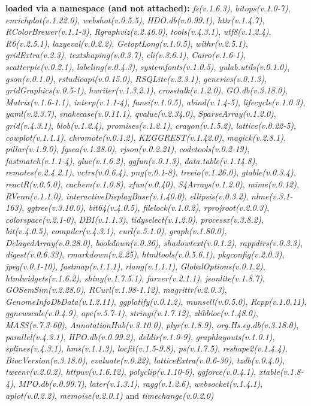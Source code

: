 \documentclass[
]{book}
\begin{document}
\textbf{loaded via a namespace (and not attached):}
\emph{fs(v.1.6.3)}, \emph{bitops(v.1.0-7)}, \emph{enrichplot(v.1.22.0)}, \emph{webshot(v.0.5.5)}, \emph{HDO.db(v.0.99.1)}, \emph{httr(v.1.4.7)}, \emph{RColorBrewer(v.1.1-3)}, \emph{Rgraphviz(v.2.46.0)}, \emph{tools(v.4.3.1)}, \emph{utf8(v.1.2.4)}, \emph{R6(v.2.5.1)}, \emph{lazyeval(v.0.2.2)}, \emph{GetoptLong(v.1.0.5)}, \emph{withr(v.2.5.1)}, \emph{gridExtra(v.2.3)}, \emph{textshaping(v.0.3.7)}, \emph{cli(v.3.6.1)}, \emph{Cairo(v.1.6-1)}, \emph{scatterpie(v.0.2.1)}, \emph{labeling(v.0.4.3)}, \emph{systemfonts(v.1.0.5)}, \emph{yulab.utils(v.0.1.0)}, \emph{gson(v.0.1.0)}, \emph{rstudioapi(v.0.15.0)}, \emph{RSQLite(v.2.3.1)}, \emph{generics(v.0.1.3)}, \emph{gridGraphics(v.0.5-1)}, \emph{hwriter(v.1.3.2.1)}, \emph{crosstalk(v.1.2.0)}, \emph{GO.db(v.3.18.0)}, \emph{Matrix(v.1.6-1.1)}, \emph{interp(v.1.1-4)}, \emph{fansi(v.1.0.5)}, \emph{abind(v.1.4-5)}, \emph{lifecycle(v.1.0.3)}, \emph{yaml(v.2.3.7)}, \emph{snakecase(v.0.11.1)}, \emph{qvalue(v.2.34.0)}, \emph{SparseArray(v.1.2.0)}, \emph{grid(v.4.3.1)}, \emph{blob(v.1.2.4)}, \emph{promises(v.1.2.1)}, \emph{crayon(v.1.5.2)}, \emph{lattice(v.0.22-5)}, \emph{cowplot(v.1.1.1)}, \emph{chromote(v.0.1.2)}, \emph{KEGGREST(v.1.42.0)}, \emph{magick(v.2.8.1)}, \emph{pillar(v.1.9.0)}, \emph{fgsea(v.1.28.0)}, \emph{rjson(v.0.2.21)}, \emph{codetools(v.0.2-19)}, \emph{fastmatch(v.1.1-4)}, \emph{glue(v.1.6.2)}, \emph{ggfun(v.0.1.3)}, \emph{data.table(v.1.14.8)}, \emph{remotes(v.2.4.2.1)}, \emph{vctrs(v.0.6.4)}, \emph{png(v.0.1-8)}, \emph{treeio(v.1.26.0)}, \emph{gtable(v.0.3.4)}, \emph{reactR(v.0.5.0)}, \emph{cachem(v.1.0.8)}, \emph{xfun(v.0.40)}, \emph{S4Arrays(v.1.2.0)}, \emph{mime(v.0.12)}, \emph{RVenn(v.1.1.0)}, \emph{interactiveDisplayBase(v.1.40.0)}, \emph{ellipsis(v.0.3.2)}, \emph{nlme(v.3.1-163)}, \emph{ggtree(v.3.10.0)}, \emph{bit64(v.4.0.5)}, \emph{filelock(v.1.0.2)}, \emph{rprojroot(v.2.0.3)}, \emph{colorspace(v.2.1-0)}, \emph{DBI(v.1.1.3)}, \emph{tidyselect(v.1.2.0)}, \emph{processx(v.3.8.2)}, \emph{bit(v.4.0.5)}, \emph{compiler(v.4.3.1)}, \emph{curl(v.5.1.0)}, \emph{graph(v.1.80.0)}, \emph{DelayedArray(v.0.28.0)}, \emph{bookdown(v.0.36)}, \emph{shadowtext(v.0.1.2)}, \emph{rappdirs(v.0.3.3)}, \emph{digest(v.0.6.33)}, \emph{rmarkdown(v.2.25)}, \emph{htmltools(v.0.5.6.1)}, \emph{pkgconfig(v.2.0.3)}, \emph{jpeg(v.0.1-10)}, \emph{fastmap(v.1.1.1)}, \emph{rlang(v.1.1.1)}, \emph{GlobalOptions(v.0.1.2)}, \emph{htmlwidgets(v.1.6.2)}, \emph{shiny(v.1.7.5.1)}, \emph{farver(v.2.1.1)}, \emph{jsonlite(v.1.8.7)}, \emph{GOSemSim(v.2.28.0)}, \emph{RCurl(v.1.98-1.12)}, \emph{magrittr(v.2.0.3)}, \emph{GenomeInfoDbData(v.1.2.11)}, \emph{ggplotify(v.0.1.2)}, \emph{munsell(v.0.5.0)}, \emph{Rcpp(v.1.0.11)}, \emph{ggnewscale(v.0.4.9)}, \emph{ape(v.5.7-1)}, \emph{stringi(v.1.7.12)}, \emph{zlibbioc(v.1.48.0)}, \emph{MASS(v.7.3-60)}, \emph{AnnotationHub(v.3.10.0)}, \emph{plyr(v.1.8.9)}, \emph{org.Hs.eg.db(v.3.18.0)}, \emph{parallel(v.4.3.1)}, \emph{HPO.db(v.0.99.2)}, \emph{deldir(v.1.0-9)}, \emph{graphlayouts(v.1.0.1)}, \emph{splines(v.4.3.1)}, \emph{hms(v.1.1.3)}, \emph{locfit(v.1.5-9.8)}, \emph{ps(v.1.7.5)}, \emph{reshape2(v.1.4.4)}, \emph{BiocVersion(v.3.18.0)}, \emph{evaluate(v.0.22)}, \emph{latticeExtra(v.0.6-30)}, \emph{tzdb(v.0.4.0)}, \emph{tweenr(v.2.0.2)}, \emph{httpuv(v.1.6.12)}, \emph{polyclip(v.1.10-6)}, \emph{ggforce(v.0.4.1)}, \emph{xtable(v.1.8-4)}, \emph{MPO.db(v.0.99.7)}, \emph{later(v.1.3.1)}, \emph{ragg(v.1.2.6)}, \emph{websocket(v.1.4.1)}, \emph{aplot(v.0.2.2)}, \emph{memoise(v.2.0.1)} and \emph{timechange(v.0.2.0)}

  
\end{document}
